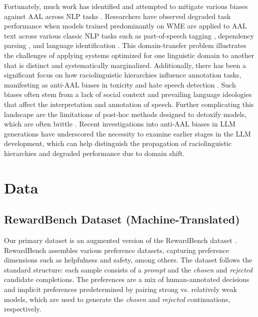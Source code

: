 Fortunately, much work has identified and attempted to mitigate various biases against AAL across NLP tasks \cite{blodgett_language_2020}. Researchers have observed degraded task performance when models trained predominantly on WME are applied to AAL text across various classic NLP tasks such as part-of-speech tagging \cite{jorgensen-etal-2015-challenges, dacon-2022-towards}, dependency parsing \cite{blodgett_demographic_2016}, and language identification \cite{blodgett_racial_2017}. This domain-transfer problem illustrates the challenges of applying systems optimized for one linguistic domain to another that is distinct and systematically marginalized. Additionally, there has been a significant focus on how raciolinguistic hierarchies influence annotation tasks, manifesting as anti-AAL biases in toxicity and hate speech detection \cite{sap_risk_2019, davidson-etal-2019-racial, sap_annotators_2022, harris_exploring_2022}. Such biases often stem from a lack of social context and prevailing language ideologies that affect the interpretation and annotation of speech. Further complicating this landscape are the limitations of post-hoc methods designed to detoxify models, which are often brittle \cite{xu_detoxifying_2021, zhou_challenges_2021}. Recent investigations into anti-AAL biases in LLM generations \cite{groenwold-etal-2020-investigating, deas_evaluation_2023, hofmann_ai_2024} have underscored the necessity to examine earlier stages in the LLM development, which can help distinguish the propagation of raciolinguistic hierarchies and degraded performance due to domain shift. 


\section{Data}
\subsection{RewardBench Dataset (Machine-Translated)}
\label{sec:rb-dataset}

Our primary dataset is an augmented version of the RewardBench dataset \cite{lambert_rewardbench_2024}. RewardBench assembles various preference datasets, capturing preference dimensions such as helpfulness and safety, among others. The dataset follows the standard structure: each sample consists of a \textit{prompt} and the \textit{chosen} and \textit{rejected} candidate completions. The preferences are a mix of human-annotated decisions and implicit preferences predetermined by pairing strong vs. relatively weak models, which are used to generate the \textit{chosen} and \textit{rejected} continuations, respectively.

